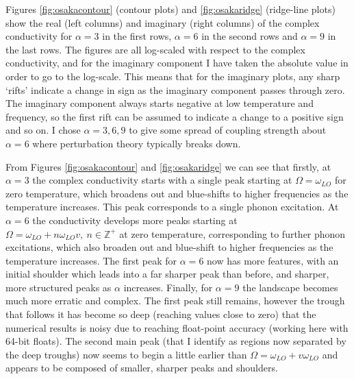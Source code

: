 Figures \ref{fig:osakacontour} (contour plots) and \ref{fig:osakaridge} (ridge-line plots) show the real (left columns) and imaginary (right columns) of the complex conductivity for $\alpha = 3$ in the first rows, $\alpha = 6$ in the second rows and $\alpha = 9$ in the last rows. The figures are all log-scaled with respect to the complex conductivity, and for the imaginary component I have taken the absolute value in order to go to the log-scale. This means that for the imaginary plots, any sharp `rifts' indicate a change in sign as the imaginary component passes through zero. The imaginary component always starts negative at low temperature and frequency, so the first rift can be assumed to indicate a change to a positive sign and so on. I chose $\alpha = 3, 6, 9$ to give some spread of coupling strength about $\alpha = 6$ where perturbation theory typically breaks down. 

From Figures \ref{fig:osakacontour} and \ref{fig:osakaridge} we can see that firstly, at $\alpha = 3$ the complex conductivity starts with a single peak starting at $\Omega = \omega_{LO}$ for zero temperature, which broadens out and blue-shifts to higher frequencies as the temperature increases. This peak corresponds to a single phonon excitation. At $\alpha = 6$ the conductivity develops more peaks starting at $\Omega = \omega_{LO} + n \omega_{LO} v,\ n \in \mathbb{Z}^+$ at zero temperature, corresponding to further phonon excitations, which also broaden out and blue-shift to higher frequencies as the temperature increases. The first peak for $\alpha = 6$ now has more features, with an initial shoulder which leads into a far sharper peak than before, and sharper, more structured peaks as $\alpha$ increases. Finally, for $\alpha = 9$ the landscape becomes much more erratic and complex. The first peak still remains, however the trough that follows it has become so deep (reaching values close to zero) that the numerical results is noisy due to reaching float-point accuracy (working here with 64-bit floats). The second main peak (that I identify as regions now separated by the deep troughs) now seems to begin a little earlier than $\Omega = \omega_{LO} + v \omega_{LO}$ and appears to be composed of smaller, sharper peaks and shoulders. 

